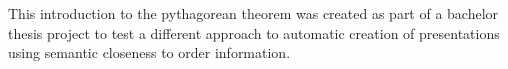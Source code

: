 	\begin{omtext}[title=Aims]
		This introduction to the pythagorean theorem was created as part of a bachelor thesis project to test a different approach to automatic creation of presentations using semantic closeness to order information.
	\end{omtext}

